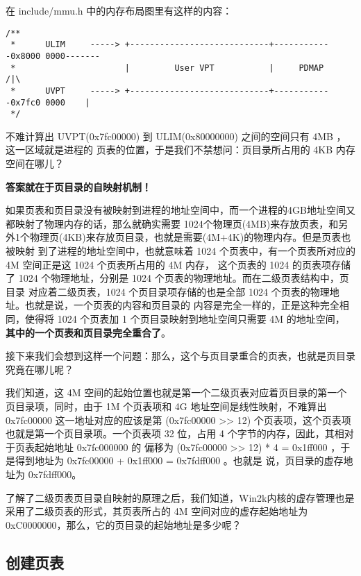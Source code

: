 在 include/mmu.h 中的内存布局图里有这样的内容：

\begin{verbatim}
/**
 *      ULIM     -----> +----------------------------+------------0x8000 0000-------
 *                      |         User VPT           |     PDMAP                /|\
 *      UVPT     -----> +----------------------------+------------0x7fc0 0000    |
 */
\end{verbatim}

不难计算出 UVPT(0x7fc00000) 到 ULIM(0x80000000) 之间的空间只有 4MB ，这一区域就是进程的
页表的位置，于是我们不禁想问：页目录所占用的 4KB 内存空间在哪儿？

\textbf{答案就在于页目录的自映射机制！}

如果页表和页目录没有被映射到进程的地址空间中，而一个进程的4GB地址空间又都映射了物理内存的话，那么就确实需要
1024个物理页(4MB)来存放页表，和另外1个物理页(4KB)来存放页目录，也就是需要(4M+4K)的物理内存。但是页表也被映射
到了进程的地址空间中，也就意味着 1024 个页表中，有一个页表所对应的 4M 空间正是这 1024 个页表所占用的 4M 内存，
这个页表的 1024 的页表项存储了 1024 个物理地址，分别是 1024 个页表的物理地址。而在二级页表结构中，页目录
对应着二级页表，1024 个页目录项存储的也是全部 1024 个页表的物理地址。也就是说，一个页表的内容和页目录的
内容是完全一样的，正是这种完全相同，使得将 1024 个页表加 1 个页目录映射到地址空间只需要 4M 的地址空间，
\textbf{其中的一个页表和页目录完全重合了}。

接下来我们会想到这样一个问题：那么，这个与页目录重合的页表，也就是页目录究竟在哪儿呢？

我们知道，这 4M 空间的起始位置也就是第一个二级页表对应着页目录的第一个页目录项，同时，由于 1M 个页表项和 4G
地址空间是线性映射，不难算出 0x7fc00000 这一地址对应的应该是第 (0x7fc00000 >> 12) 个页表项，这个页表项
也就是第一个页目录项。一个页表项 32 位，占用 4 个字节的内存，因此，其相对于页表起始地址 0x7fc000000 的
偏移为 (0x7fc00000 >> 12) * 4 = 0x1ff000 ，于是得到地址为 0x7fc00000 + 0x1ff000 = 0x7fdff000 。也就是
说，页目录的虚存地址为 0x7fdff000。

\begin{thinking}\label{think-windows_pde_addr}
了解了二级页表页目录自映射的原理之后，我们知道，Win2k内核的虚存管理也是采用了二级页表的形式，其页表所占的 4M
空间对应的虚存起始地址为 0xC0000000，那么，它的页目录的起始地址是多少呢？
\end{thinking}

\subsection{创建页表}

